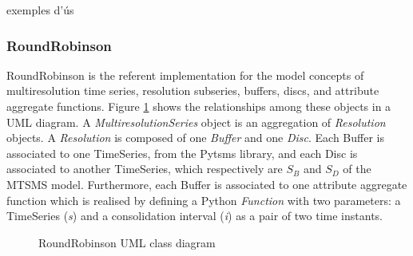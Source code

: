 \todo{}

exemples d'ús



\subsubsection{RoundRobinson}


RoundRobinson is the referent implementation for the model concepts of
multiresolution time series, resolution subseries, buffers, discs, and
attribute aggregate functions. Figure
\ref{fig:implementacio:roundrobinson-uml} shows the relationships
among these objects in a UML diagram. A \emph{MultiresolutionSeries}
object is an aggregation of \emph{Resolution} objects. A
\emph{Resolution} is composed of one \emph{Buffer} and one
\emph{Disc}. Each Buffer is associated to one TimeSeries, from the
Pytsms library, and each Disc is associated to another TimeSeries,
which respectively are $S_B$ and $S_D$ of the MTSMS
model. Furthermore, each Buffer is associated to one attribute
aggregate function which is realised by defining a Python
\emph{Function} with two parameters: a TimeSeries (\emph{s}) and a
consolidation interval (\emph{i}) as a pair of two time instants.




\begin{figure}[tp]
  \centering


  \caption{RoundRobinson UML class diagram}
  \label{fig:implementacio:roundrobinson-uml}
\end{figure}



